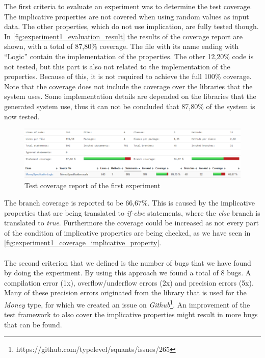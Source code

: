 The first criteria to evaluate an experiment was to determine the test
coverage. The implicative properties are not covered when using random
values as input data. The other properties, which do not use implication, are
fully tested though. In \autoref{fig:experiment1_evaluation_result} the results of the coverage report are shown, with a total of 87,80\% coverage. The file with its name
ending with ``Logic'' contain the implementation of the properties. The other 12,20\% code is not tested, but this part is also not related to the implementation of the properties. Because of this, it is not required to achieve the full 100\% coverage. Note that the coverage does not include the coverage over the libraries that the system uses. Some implementation details are depended on the libraries that the generated system use, thus it can not be concluded that 87,80\% of the system is now tested.
\begin{figure}[!ht]
	\includegraphics[width=\linewidth]{figures/eval_e1}
\caption{Test coverage report of the first experiment}
\label{fig:experiment1_evaluation_result}
\centering
\end{figure}
\FloatBarrier
The branch coverage is reported to be 66,67\%. This is caused by the implicative properties that are being translated to \textit{if-else} statements, where the \textit{else} branch is translated to \textit{true}. Furthermore the coverage could be increased as not every part of the condition of implicative properties are being checked, as we have seen in \autoref{fig:experiment1_coverage_implicative_property}.\\
\\
The second criterion that we defined is the number of bugs that we have found
by doing the experiment. By using this approach we found a total of 8 bugs. A
compilation error (1x), overflow/underflow errors (2x) and precision errors (5x). Many of these
precision errors originated from the library that is used for the \textit{Money}
type, for which we created an issue on
\textit{Github}\footnote{https://github.com/typelevel/squants/issues/265}. An
improvement of the test framework to also cover the implicative properties might
result in more bugs that can be found.

